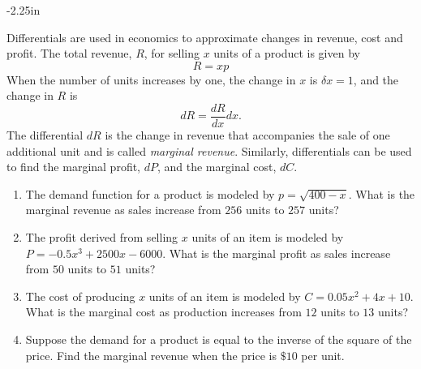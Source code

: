 \begin{adjustwidth*}{}{-2.25in}
\begin{multicols*}{2}

Differentials are used in economics to approximate changes in revenue, cost and profit. The  total revenue, $R$, for selling $x$ units of a product is given by
\[ R=xp\]  
When the number of units increases by one, the change in $x$ is $\delta x=1$, and the change in $R$ is \[ dR = \frac{dR}{dx} dx. \]
The differential $dR$ is the change in revenue that accompanies the sale of one additional unit and is called \emph{marginal revenue}. Similarly, differentials can be used to find the marginal profit, $dP$, and the marginal cost, $dC$. 
\begin{enumerate}[1),start=35]
\item		The demand function for a product is modeled by $p=\sqrt{400-x}$. What is the marginal revenue as sales increase from $256$ units to $257$ units?
\item		The profit derived from selling $x$ units of an item is modeled by $P=-0.5x^3+2500x-6000$. What is the marginal profit as sales increase from $50$ units to $51$ units?
\item		The cost of producing $x$ units of an item is modeled by $C=0.05x^2+4x+10$. What is the marginal cost as production increases from $12$ units to $13$ units?
\item 		Suppose the demand for a product is equal to the inverse of the square of the price. Find the marginal revenue when the price is $\$10$ per unit.
\end{enumerate}

\end{multicols*}
\end{adjustwidth*}

\afterexercises